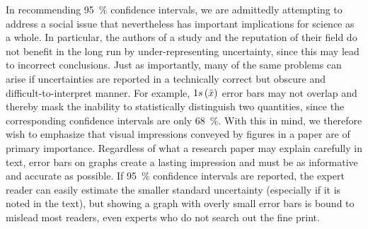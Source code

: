 In recommending 95~\% confidence intervals, we are admittedly attempting to address a social issue that nevertheless has important implications for science as a whole. In particular, the authors of a study and the reputation of their field do not benefit in the long run by under-representing uncertainty, since this may lead to incorrect conclusions. Just as importantly, many of the same problems can arise if uncertainties are reported in a technically correct but obscure and difficult-to-interpret manner. For example, $1s\left( \bar{x} \right)$ error bars may not overlap and thereby mask the inability to statistically distinguish two quantities, since the corresponding confidence intervals are only 68~\%. With this in mind, we therefore wish to emphasize that visual impressions conveyed by figures in a paper are of primary importance. Regardless of what a research paper may explain carefully in text, error bars on graphs create a lasting impression and must be as informative and accurate as possible. If 95~\% confidence intervals are reported, the expert reader can easily estimate the smaller standard uncertainty (especially if it is noted in the text), but showing a graph with overly small error bars is bound to mislead most readers, even experts who do not search out the fine print.









